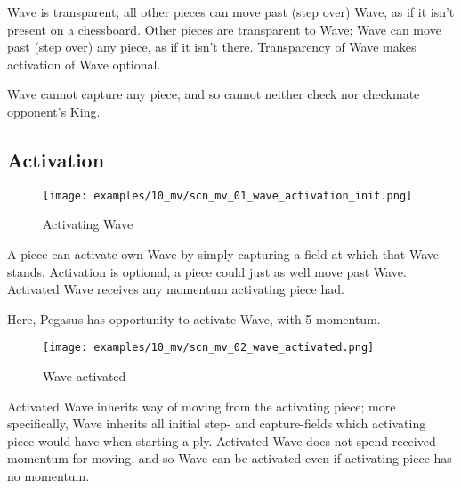 Wave is transparent; all other pieces can move past (step over) Wave, as if it
isn't present on a chessboard. Other pieces are transparent to Wave; Wave can move
past (step over) any piece, as if it isn't there. Transparency of Wave makes
activation of Wave optional.

Wave cannot capture any piece; and so cannot neither check nor checkmate opponent's
King.

\clearpage %

\subsection*{Activation}
\label{sec:Miranda's veil/Wave/Activation}

\vspace*{-1.5\baselineskip}
\noindent
\begin{figure}[!h]
\texttt{[image: examples/10\_mv/scn\_mv\_01\_wave\_activation\_init.png]}
\vspace*{-1.4\baselineskip}
\caption{Activating Wave}
\label{fig:scn_mv_01_wave_activation_init}
\end{figure}

\vspace*{-0.5\baselineskip}
A piece can activate own Wave by simply capturing a field at which that Wave stands.
Activation is optional, a piece could just as well move past Wave. Activated Wave
receives any momentum activating piece had.

Here, Pegasus has opportunity to activate Wave, with 5 momentum.

\clearpage %

\vspace*{-2.1\baselineskip}
\noindent
\begin{figure}[!h]
\texttt{[image: examples/10\_mv/scn\_mv\_02\_wave\_activated.png]}
\vspace*{-1.4\baselineskip}
\caption{Wave activated}
\label{fig:scn_mv_02_wave_activated}
\end{figure}

\vspace*{-0.5\baselineskip}
Activated Wave inherits way of moving from the activating piece; more specifically,
Wave inherits all initial step- and capture-fields which activating piece would
have when starting a ply. Activated Wave does not spend received momentum for moving,
and so Wave can be activated even if activating piece has no momentum.

